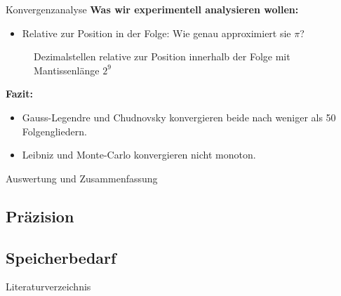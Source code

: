 \documentclass[9pt, t]{beamer}
\begin{document}
\begin{frame}{Konvergenzanalyse}
    \small
    \textbf{Was wir experimentell analysieren wollen:}
    \pause
    \begin{itemize}
        \item Relative zur Position in der Folge: Wie genau approximiert sie
              \(\pi\)?
    \end{itemize}
    \begin{figure}[H]
        \centering
        \subfloat{%
            
        }
        \subfloat{%
            
        }
        \caption{%
            Dezimalstellen relative zur Position innerhalb der Folge mit Mantissenlänge \(2^9\)
        }
    \end{figure}
    \pause
    \textbf{Fazit:}
    \begin{itemize}
        \item Gauss-Legendre und Chudnovsky konvergieren beide nach weniger als
              50 Folgengliedern.
        \item Leibniz und Monte-Carlo konvergieren nicht monoton.
    \end{itemize}
\end{frame}

\begin{frame}{Auswertung und Zusammenfassung}

\end{frame}

\subsection{Präzision}

\subsection{Speicherbedarf}

\begin{frame}{Literaturverzeichnis}
    \printbibliography
\end{frame}
\end{document}

